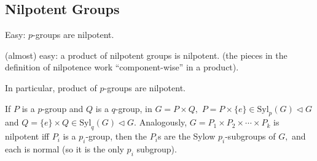 \documentclass[a4paper]{article}
\begin{document}
\subsection{Nilpotent Groups}
Easy: $p$-groups are nilpotent.

(almost) easy: a product of nilpotent groups is nilpotent. (the pieces in the definition of nilpotence work ``component-wise'' in a product).

In particular, product of $p$-groups are nilpotent.

If $P$ is a $p$-group and $Q$ is a $q$-group, in $G=P\times Q,$ $P=P\times\{e\}\in\mathrm{Syl}_p(G)\triangleleft G$ and $Q=\{e\}\times Q\in\mathrm{Syl}_q(G)\triangleleft G.$ Analogously, $G=P_1\times P_2\times\cdots\times P_k$ is nilpotent iff $P_i$ is a $p_i$-group, then the $P_i$s are the Sylow $p_i$-subgroups of $G,$ and each is normal (so it is the only $p_i$ subgroup).
\end{document}

